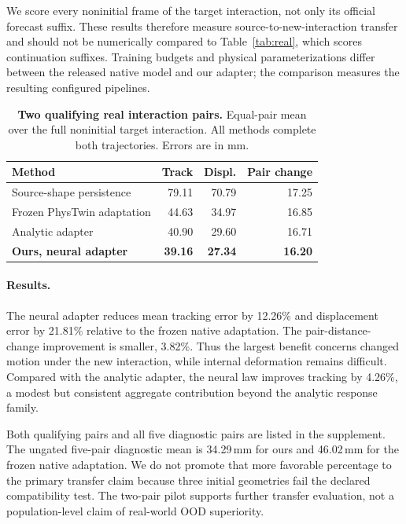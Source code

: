 \documentclass[10pt,twocolumn,letterpaper]{article}
\begin{document}
We score every noninitial frame of the target interaction, not only its official forecast suffix. These results therefore measure source-to-new-interaction transfer and should not be numerically compared to Table~\ref{tab:real}, which scores continuation suffixes. Training budgets and physical parameterizations differ between the released native model and our adapter; the comparison measures the resulting configured pipelines.

\begin{table}[h]
\centering\small\setlength{\tabcolsep}{3pt}
\caption{\textbf{Two qualifying real interaction pairs.} Equal-pair mean over the full noninitial target interaction. All methods complete both trajectories. Errors are in mm.}
\label{tab:transfer}
\begin{tabular}{lrrr}\toprule
Method & Track & Displ. & Pair change\\\midrule
Source-shape persistence &79.11&70.79&17.25\\
Frozen PhysTwin adaptation &44.63&34.97&16.85\\
Analytic adapter &40.90&29.60&16.71\\
\textbf{Ours, neural adapter} &\textbf{39.16}&\textbf{27.34}&\textbf{16.20}\\\bottomrule
\end{tabular}
\end{table}

\paragraph{Results.}
The neural adapter reduces mean tracking error by 12.26\% and displacement error by 21.81\% relative to the frozen native adaptation. The pair-distance-change improvement is smaller, 3.82\%. Thus the largest benefit concerns changed motion under the new interaction, while internal deformation remains difficult. Compared with the analytic adapter, the neural law improves tracking by 4.26\%, a modest but consistent aggregate contribution beyond the analytic response family.

Both qualifying pairs and all five diagnostic pairs are listed in the supplement. The ungated five-pair diagnostic mean is 34.29\,mm for ours and 46.02\,mm for the frozen native adaptation. We do not promote that more favorable percentage to the primary transfer claim because three initial geometries fail the declared compatibility test. The two-pair pilot supports further transfer evaluation, not a population-level claim of real-world OOD superiority.
\end{document}
